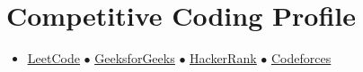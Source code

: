 \documentclass[]{resume-openfont}
\newcommand{\resumeHeading}[4]{\runsubsection{\uppercase{#1}}\descript{ | #2}\hfill\location{#3 | #4}\fakeNewLine}
\begin{document}
\sectionsep
\section{Competitive Coding Profile}
\begin{itemize}
    \item \href{https://leetcode.com/kanthreddygaddamchandra/}{\underline{LeetCode}} $\bullet$ \href{https://auth.geeksforgeeks.org/user/chand17/practice/}{\underline{GeeksforGeeks}} $\bullet$ \href{https://www.hackerrank.com/chandu_stinsfire}{\underline{HackerRank}} $\bullet$ \href{https://codeforces.com/profile/chand_stinsy}{\underline{Codeforces}}
    
\end{itemize}
\end{document}
